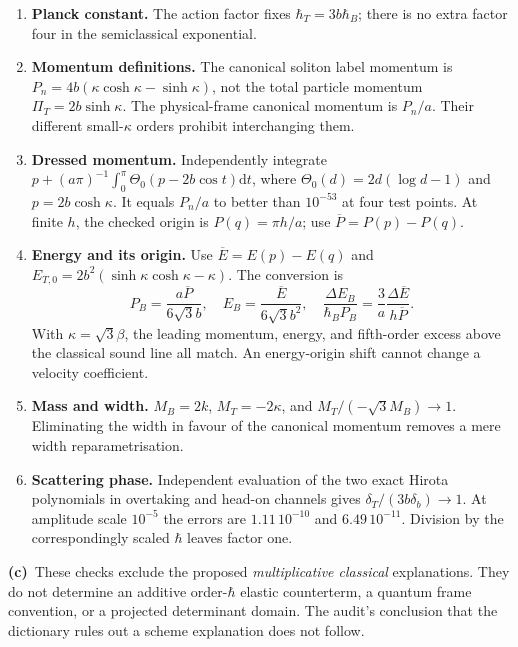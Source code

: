 \documentclass[11pt,a4paper]{article}
\newcommand{\Lc}{\textbf{(c)}\ }
\newcommand{\dd}{\mathrm d}
\begin{document}
\begin{enumerate}
\item \textbf{Planck constant.} The action factor fixes $\hbar_T=3b\hbar_B$;
there is no extra factor four in the semiclassical exponential.
\item \textbf{Momentum definitions.} The canonical soliton label momentum
is $P_n=4b(\kappa\cosh\kappa-\sinh\kappa)$, not the total particle
momentum $\Pi_T=2b\sinh\kappa$. The physical-frame canonical momentum is
$P_n/a$. Their different small-$\kappa$ orders prohibit interchanging them.
\item \textbf{Dressed momentum.} Independently integrate
$p+(a\pi)^{-1}\int_0^\pi\Theta_0(p-2b\cos t)\dd t$, where
$\Theta_0(d)=2d(\log d-1)$ and $p=2b\cosh\kappa$.
It equals $P_n/a$ to better than $10^{-53}$ at four test points.
At finite $h$, the checked origin is $P(q)=\pi h/a$; use
$\overline P=P(p)-P(q)$.
\item \textbf{Energy and its origin.} Use $\overline E=E(p)-E(q)$ and
$E_{T,0}=2b^2(\sinh\kappa\cosh\kappa-\kappa)$. The conversion is
\begin{equation}\label{eq:units}
 P_B=\frac{a\overline P}{6\sqrt3 b},\quad
 E_B=\frac{\overline E}{6\sqrt3 b^2},\quad
 \frac{\Delta E_B}{\hbar_B P_B}
 =\frac3a\frac{\Delta\overline E}{h\overline P}.
\end{equation}
With $\kappa=\sqrt3\beta$, the leading momentum, energy, and fifth-order
excess above the classical sound line all match. An energy-origin shift
cannot change a velocity coefficient.
\item \textbf{Mass and width.} $M_B=2k$, $M_T=-2\kappa$, and
$M_T/(-\sqrt3M_B)\to1$. Eliminating the width in favour of the canonical
momentum removes a mere width reparametrisation.
\item \textbf{Scattering phase.} Independent evaluation of the two exact
Hirota polynomials in overtaking and head-on channels gives
$\delta_T/(3b\delta_b)\to1$. At amplitude scale $10^{-5}$ the errors are
$1.11\,10^{-10}$ and $6.49\,10^{-11}$. Division by the correspondingly
scaled $\hbar$ leaves factor one.
\end{enumerate}
\Lc These checks exclude the proposed \emph{multiplicative classical}
explanations. They do not determine an additive order-$\hbar$ elastic
counterterm, a quantum frame convention, or a projected determinant domain.
The audit's conclusion that the dictionary rules out a scheme explanation
does not follow.
\end{document}
